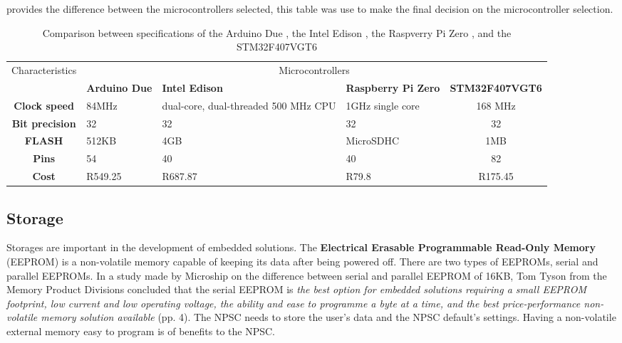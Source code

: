  provides the difference between the microcontrollers selected, this table was use to make the final decision on the microcontroller selection.
\begin{table}[h!]
\centering
\begin{tabular}{cp{5em}p{8em}p{5em}c}
\hline
\hline
\multirow{2}{*}{Characteristics}  & \multicolumn{4}{c}{Microcontrollers} \\  
 & \textbf{Arduino Due} & \textbf{Intel Edison} & \textbf{Raspberry Pi Zero} & \textbf{STM32F407VGT6} \\
\hline
\textbf{Clock speed} & 84MHz &  dual-core, dual-threaded 500 MHz CPU & 1GHz single core & 168 MHz\\
\textbf{Bit precision} & 32 & 32 & 32 & 32 \\
\textbf{FLASH} & 512KB & 4GB & MicroSDHC & 1MB \\
\textbf{Pins} & 54 & 40 & 40 & 82\\
\textbf{Cost} & R549.25 & R687.87 & R79.8 & R175.45\\
\hline
\hline
\end{tabular}
\caption{Comparison between specifications of the Arduino Due \cite{arduino}, the Intel Edison \cite{intel}, the Raspverry Pi Zero \cite{raspberry}, and the STM32F407VGT6\cite{stm}}
\label{table:micro}
\end{table}

\subsection{Storage}
Storages are important in the development of embedded solutions. The \textbf{Electrical Erasable Programmable Read-Only Memory} (EEPROM) is a non-volatile memory capable of keeping its data after being powered off. There are two types of EEPROMs, serial and parallel EEPROMs. In a study made by Microship on the difference between serial and parallel EEPROM of 16KB, Tom Tyson from the Memory Product Divisions concluded that the serial EEPROM is \textit{the best option for embedded solutions requiring a small EEPROM footprint, low current and low operating voltage, the ability and ease to programme a byte at a time, and the best price-performance non-volatile memory solution available}\cite{serialvsparallel} (pp. 4).
The NPSC needs to store the user's data and the NPSC default's settings. Having a non-volatile external memory easy to program is of benefits to the NPSC.

